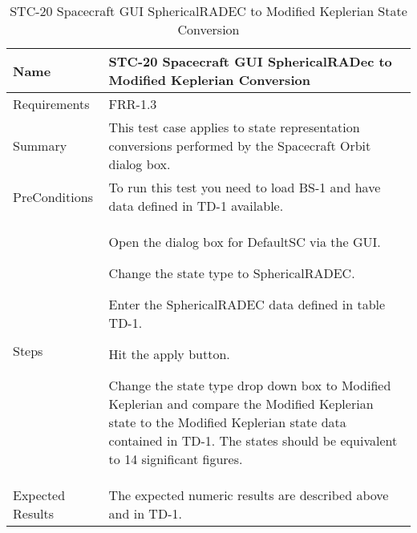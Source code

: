 \begin{table}[htbp!]
\centering
      \begin{tabular}{|p{1.05 in} |p{4.75 in} |}
      \hline
         \rowcolor[rgb]{0.8,0.8,0.8} Name & STC-20 Spacecraft GUI SphericalRADec to Modified Keplerian Conversion\\
         \hline
         Requirements & FRR-1.3\\ \hline
         Summary &
         This test case applies to state representation conversions performed by the Spacecraft Orbit dialog box.  \\
         \hline
         PreConditions & To run this test you need to load BS-1 and have data defined in TD-1 available.\\
         \hline
         Steps &
         \begin{compactenum}
         \item Open the dialog box for DefaultSC via the GUI.
         \item Change the state type to SphericalRADEC.
         \item Enter the SphericalRADEC data defined in table TD-1.
         \item Hit the apply button.
         \item Change the state type drop down box to Modified Keplerian and compare the Modified Keplerian state to the
         Modified Keplerian state data contained in TD-1. The states should be equivalent to 14 significant figures.
         \end{compactenum}\\
         \hline
         Expected Results & The expected numeric results are described above and in TD-1.\\
      \hline
\end{tabular}
      \label{Table: STC-20}
      \caption{STC-20 Spacecraft GUI SphericalRADEC to Modified Keplerian State Conversion}
\end{table} 